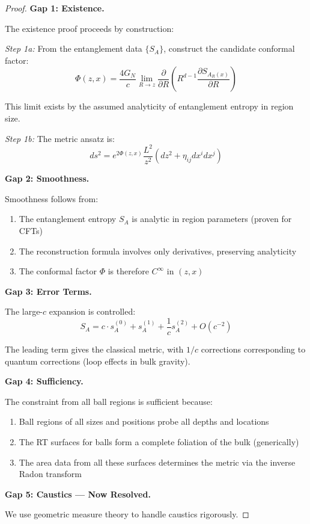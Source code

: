 \documentclass[12pt,a4paper]{article}
\begin{document}
\begin{proof}
\textbf{Gap 1: Existence.}

The existence proof proceeds by construction:

\textit{Step 1a:} From the entanglement data $\{S_A\}$, construct the candidate conformal factor:
\begin{equation}
\Phi(z, x) = \frac{4G_N}{c} \lim_{R \to z} \frac{\partial}{\partial R}\left( R^{d-1} \frac{\partial S_{A_R(x)}}{\partial R} \right)
\end{equation}

This limit exists by the assumed analyticity of entanglement entropy in region size.

\textit{Step 1b:} The metric ansatz is:
\begin{equation}
ds^2 = e^{2\Phi(z,x)} \frac{L^2}{z^2}(dz^2 + \eta_{ij}dx^i dx^j)
\end{equation}

\textbf{Gap 2: Smoothness.}

Smoothness follows from:
\begin{enumerate}
    \item The entanglement entropy $S_A$ is analytic in region parameters (proven for CFTs)
    \item The reconstruction formula involves only derivatives, preserving analyticity
    \item The conformal factor $\Phi$ is therefore $C^\infty$ in $(z, x)$
\end{enumerate}

\textbf{Gap 3: Error Terms.}

The large-$c$ expansion is controlled:
\begin{equation}
S_A = c \cdot s_A^{(0)} + s_A^{(1)} + \frac{1}{c}s_A^{(2)} + O(c^{-2})
\end{equation}

The leading term gives the classical metric, with $1/c$ corrections corresponding to quantum corrections (loop effects in bulk gravity).

\textbf{Gap 4: Sufficiency.}

The constraint from all ball regions is sufficient because:
\begin{enumerate}
    \item Ball regions of all sizes and positions probe all depths and locations
    \item The RT surfaces for balls form a complete foliation of the bulk (generically)
    \item The area data from all these surfaces determines the metric via the inverse Radon transform
\end{enumerate}

\textbf{Gap 5: Caustics --- Now Resolved.}

We use geometric measure theory to handle caustics rigorously.
\end{proof}
\end{document}
